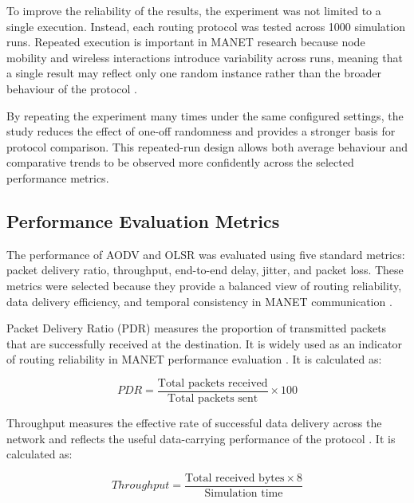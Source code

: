 \documentclass{Academic}
\begin{document}
To improve the reliability of the results, the experiment was not limited to a single execution. Instead, each routing protocol was tested across 1000 simulation runs. Repeated execution is important in MANET research because node mobility and wireless interactions introduce variability across runs, meaning that a single result may reflect only one random instance rather than the broader behaviour of the protocol \parencite{campanile2020,kour2025,selim2025}.

By repeating the experiment many times under the same configured settings, the study reduces the effect of one-off randomness and provides a stronger basis for protocol comparison. This repeated-run design allows both average behaviour and comparative trends to be observed more confidently across the selected performance metrics.

\subsection{Performance Evaluation Metrics}

The performance of AODV and OLSR was evaluated using five standard metrics: packet delivery ratio, throughput, end-to-end delay, jitter, and packet loss. These metrics were selected because they provide a balanced view of routing reliability, data delivery efficiency, and temporal consistency in MANET communication \parencite{carneiro2009flowmonitor,mohapatra2012,sarao2022,selim2025}.

Packet Delivery Ratio (PDR) measures the proportion of transmitted packets that are successfully received at the destination. It is widely used as an indicator of routing reliability in MANET performance evaluation \parencite{mohapatra2012,radha2018,sarao2022}. It is calculated as:

\begin{equation}
PDR = \frac{\text{Total packets received}}{\text{Total packets sent}} \times 100
\end{equation}

Throughput measures the effective rate of successful data delivery across the network and reflects the useful data-carrying performance of the protocol \parencite{carneiro2009flowmonitor,mohapatra2012,selim2025}. It is calculated as:

\begin{equation}
Throughput = \frac{\text{Total received bytes} \times 8}{\text{Simulation time}}
\end{equation}
\end{document}
